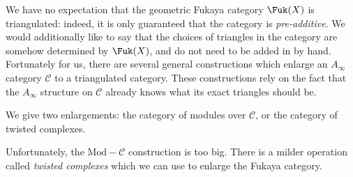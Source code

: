 

We have no expectation that the geometric Fukaya category $\Fuk(X)$ is triangulated: indeed, it is only guaranteed that the category is \emph{pre-additive}. We would additionally like to say that the choices of triangles in the category are somehow determined by $\Fuk(X)$, and do not need to be added in by hand. 
Fortunately for us, there are several general constructions which enlarge an $A_\infty$ category $\mathcal C$ to a triangulated category. These constructions rely on the fact that the $A_\infty$ structure on $\mathcal C$ already knows what its exact triangles should be. 

We give two enlargements: the category of modules over $\mathcal C$, or the category of twisted complexes.



Unfortunately, the $\text{Mod}-\mathcal C$ construction is too big.  There is a milder operation called \emph{twisted complexes} which we can use to enlarge the Fukaya category.



